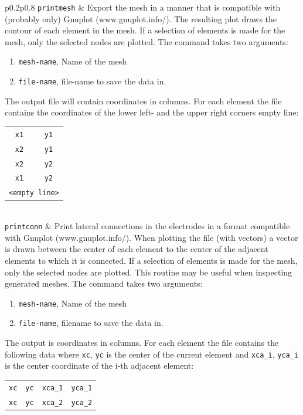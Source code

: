 \documentclass[noshowpacs,preprintnumbers,amsmath,amssymb, letter]{revtex4}
\begin{document}
\begin{longtable}{p{}p{}}
\texttt{printmesh}	& Export the mesh in a manner that is compatible with (probably only) Gnuplot (www.gnuplot.info/). The resulting plot draws the contour of each element in the mesh. If a selection of elements is made for the mesh, only the selected nodes are plotted. The command takes two arguments:
\begin{enumerate}
\item \texttt{mesh-name}, Name of the mesh
\item \texttt{file-name}, file-name to save the data in.
\end{enumerate}
The output file will contain coordinates in columns. For each element the file contains the coordinates of the lower left- and the upper right corners empty line:\newline 
\begin{tabular}{cc}
	\texttt{x1} & \texttt{y1} \\
	\texttt{x2} & \texttt{y1} \\
	\texttt{x2} & \texttt{y2} \\
	\texttt{x1} & \texttt{y2} \\
	\multicolumn{2}{l}{\texttt{<empty line>}}\\
\end{tabular}\\
\texttt{printconn}	& Print lateral connections in the electrodes in a format compatible with Gnuplot (www.gnuplot.info/). When plotting the file (with vectors) a vector is drawn between the center of each element to the center of the adjacent elements to which it is connected. If a selection of elements is made for the mesh, only the selected nodes are plotted. This routine may be useful when inspecting generated meshes. The command takes two arguments:
\begin{enumerate}
\item \texttt{mesh-name}, Name of the mesh
\item \texttt{file-name}, filename to save the data in.
\end{enumerate}
The output is coordinates in columns. For each element the file contains the following data where \texttt{xc}, \texttt{yc} is the center of the current element and \texttt{xca\_i}, \texttt{yca\_i} is the center coordinate of the i-th adjacent element: 
\begin{tabular}{cccc}
	\texttt{xc} & \texttt{yc} & \texttt{xca\_1} & \texttt{yca\_1} \\
	\texttt{xc} & \texttt{yc} & \texttt{xca\_2} & \texttt{yca\_2} \\

\end{tabular}
\end{longtable}
\end{document}
